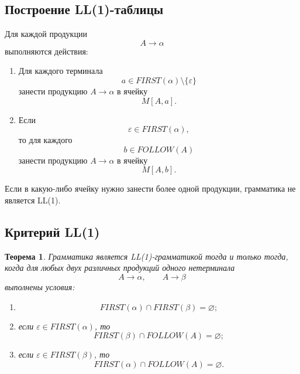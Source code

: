 \documentclass[12pt,a4paper]{article}
\newtheorem{theorem}{Теорема}
\begin{document}
\subsection{Построение LL(1)-таблицы}

Для каждой продукции
\[
A \to \alpha
\]
выполняются действия:
\begin{enumerate}
    \item Для каждого терминала
    \[
    a \in FIRST(\alpha)\setminus\{\varepsilon\}
    \]
    занести продукцию $A \to \alpha$ в ячейку
    \[
    M[A,a].
    \]
    \item Если
    \[
    \varepsilon \in FIRST(\alpha),
    \]
    то для каждого
    \[
    b \in FOLLOW(A)
    \]
    занести продукцию $A \to \alpha$ в ячейку
    \[
    M[A,b].
    \]
\end{enumerate}

Если в какую-либо ячейку нужно занести более одной продукции, грамматика не является LL(1).

\subsection{Критерий LL(1)}

\begin{theorem}
Грамматика является LL(1)-грамматикой тогда и только тогда, когда для любых двух различных продукций одного нетерминала
\[
A \to \alpha,\qquad A \to \beta
\]
выполнены условия:
\begin{enumerate}
    \item
    \[
    FIRST(\alpha)\cap FIRST(\beta)=\varnothing;
    \]
    \item если $\varepsilon \in FIRST(\alpha)$, то
    \[
    FIRST(\beta)\cap FOLLOW(A)=\varnothing;
    \]
    \item если $\varepsilon \in FIRST(\beta)$, то
    \[
    FIRST(\alpha)\cap FOLLOW(A)=\varnothing.
    \]
\end{enumerate}
\end{theorem}
\end{document}
